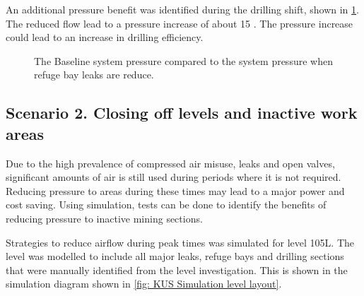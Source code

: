 	An additional pressure benefit was identified during the drilling shift, shown in  \cref{fig: RefugeBay Pressures.}. The reduced flow lead to a pressure increase of about 15 . The pressure increase could lead to an increase in drilling efficiency.
	\begin{figure}[h]
		\centering
		
		\caption{The Baseline system pressure compared to the system pressure when refuge bay leaks are reduce.}
		\label{fig: RefugeBay Pressures.}
	\end{figure}  
	\clearpage
	\subsection{Scenario 2. Closing off levels and inactive work areas}
	Due to the high prevalence of compressed air misuse, leaks and open valves, significant amounts of air is still used during periods where it is not required. Reducing pressure to areas during these times may lead to a major power and cost saving. Using simulation, tests can be done to identify the benefits of reducing pressure to inactive mining sections.
	\par 
	Strategies to reduce airflow during peak times was simulated for level 105L. The level was modelled to include all major leaks, refuge bays and drilling sections that were manually identified from the level investigation. This is shown in the simulation diagram shown in \cref{fig: KUS Simulation level layout}. 
